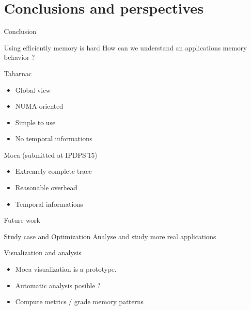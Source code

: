 \documentclass[xcolor={usenames,dvipsnames}]{beamer}
\begin{document}
\section{Conclusions and perspectives}
\begin{frame}{Conclusion}
    \begin{exampleblock}{Using efficiently memory is hard}
        How can we understand an applications memory behavior ?
    \end{exampleblock}
    \pause
    \begin{block}{Tabarnac\cite{Beniamine15TABARNAC}}
        \begin{itemize}
            \item Global view
            \item NUMA oriented
            \item Simple to use
            \item No temporal informations
        \end{itemize}
    \end{block}
    \pause
    \begin{alertblock}{Moca (submitted at IPDPS'15)}
        \begin{itemize}
            \item Extremely complete trace
            \item Reasonable overhead
            \item Temporal informations
        \end{itemize}
    \end{alertblock}
\end{frame}

\setcounter{finalframe}{\value{framenumber}}

\begin{frame}{Future work}
    \begin{block}{Study case and Optimization}
        Analyse and study more real applications
    \end{block}
    \pause
    \begin{alertblock}{Visualization and analysis}
        \begin{itemize}[<+->]
            \item Moca visualization is a prototype.
            \item Automatic analysis posible ?
            \item Compute metrics / grade memory patterns
        \end{itemize}
    \end{alertblock}
\end{frame}
\end{document}
